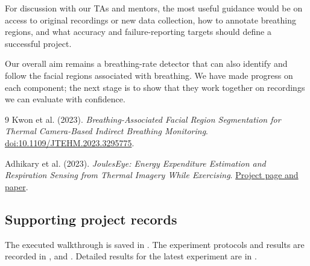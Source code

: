 \documentclass[11pt,a4paper]{article}
\begin{document}
For discussion with our TAs and mentors, the most useful guidance would be on access to original recordings or new data collection, how to annotate breathing regions, and what accuracy and failure-reporting targets should define a successful project.

Our overall aim remains a breathing-rate detector that can also identify and follow the facial regions associated with breathing. We have made progress on each component; the next stage is to show that they work together on recordings we can evaluate with confidence.

\begin{thebibliography}{9}
Kwon et al. (2023).
\textit{Breathing-Associated Facial Region Segmentation for Thermal Camera-Based Indirect Breathing Monitoring}.
\href{https://doi.org/10.1109/JTEHM.2023.3295775}{doi:10.1109/JTEHM.2023.3295775}.

Adhikary et al. (2023).
\textit{JoulesEye: Energy Expenditure Estimation and Respiration Sensing from Thermal Imagery While Exercising}.
\href{https://sustainability-lab.github.io/jouleseye/}{Project page and paper}.
\end{thebibliography}

\subsection*{Supporting project records}
The executed walkthrough is saved in
.
The experiment protocols and results are recorded in
,
 and
.
Detailed results for the latest experiment are in
.
\end{document}
